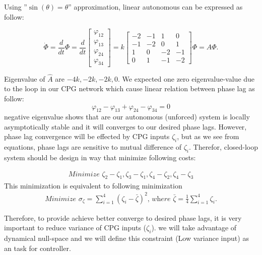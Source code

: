 \documentclass{article}
\begin{document}
Using ''\small{$\sin(\theta)=\theta$}'' approximation, linear autonomous can be expressed as follow:

  
  	\[ \dot{\Phi} = \frac{d}{dt} \Phi =\frac{d}{dt}
  	\left[\begin{array}{c}\varphi_{12} \\ \varphi_{13} \\ \varphi_{24} \\ \varphi_{34}\end{array}\right]
  	=k\left[ \begin{array}{rrrr}
	-2 & -1 &  1 &  0   \\
	-1 & -2 &  0 &  1  \\
	 1 &  0 & -2 & -1   \\
	 0 &  1 & -1 & -2 
	\end{array} \right] \Phi = \hat{A}\Phi.\] 
	
Eigenvalue of $\hat{A}$ are $-4k,-2k,-2k, 0$. We expected one zero eigenvalue-value due to the loop in our CPG network which cause linear relation between phase lag as follow: $$\varphi_{12} - \varphi_{13} + \varphi_{24} - \varphi_{34} = 0$$
negative eigenvalue shows that are our autonomous (unforced) system is locally asymptotically stable and it will converges to our desired phase lags. However, phase lag convergence will be effected by CPG inputs $\zeta_i$, but as we see from equations, phase lags are sensitive to mutual difference of $\zeta_i$. Therefor, closed-loop system should be design in way that minimize following costs:

\begin{eqnarray}\label{eq:one_node}
	\textit{Minimize    } \zeta_2-\zeta_1, \zeta_3-\zeta_1, \zeta_4-\zeta_2, \zeta_4-\zeta_3 
\end{eqnarray}
This minimization is equivalent to following minimization
\begin{eqnarray}\label{eq:one_node}
	\textit{Minimize    } \sigma_{\zeta} = \sum\limits_{i=1}^4 \left( \zeta_i - \bar{\zeta} \right)^2 \textit{, where } \bar{\zeta} = \frac{1}{4}\sum\limits_{i=1}^4\zeta_i.
\end{eqnarray}

Therefore, to provide achieve better converge to desired phase lags, it is very important to reduce variance of CPG inputs ($\zeta_i$). we will take advantage of dynamical null-space and we will define this constraint (Low variance input) as an task for controller.
\end{document}
